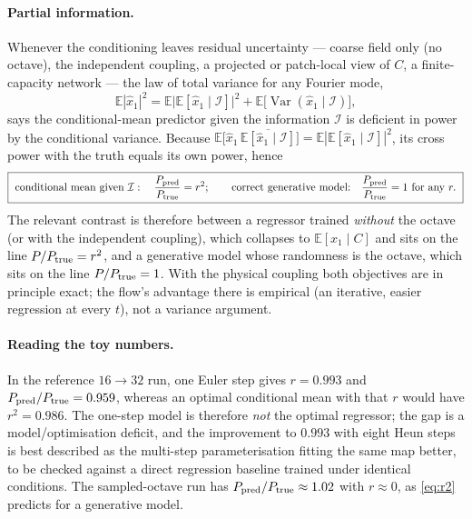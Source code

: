 \documentclass[11pt]{article}
\theoremstyle{definition}
\newcommand{\E}{\mathbb{E}}
\newcommand{\Var}{\operatorname{Var}}
\begin{document}
\paragraph{Partial information.} Whenever the conditioning leaves residual uncertainty --- coarse field only (no octave), the independent coupling, a projected or patch-local view of $C$, a finite-capacity network --- the law of total variance for any Fourier mode,
\begin{equation}
\E|\hat x_1|^2=\E\big|\E[\hat x_1\mid\mathcal I]\big|^2+\E\big[\Var(\hat x_1\mid\mathcal I)\big],
\end{equation}
says the conditional-mean predictor given the information $\mathcal I$ is deficient in power by the conditional variance. Because $\E\big[\hat x_1\,\overline{\E[\hat x_1\mid\mathcal I]}\big]=\E|\E[\hat x_1\mid\mathcal I]|^2$, its cross power with the truth equals its own power, hence
\begin{equation}
\boxed{\ \text{conditional mean given }\mathcal I:\quad \frac{P_{\rm pred}}{P_{\rm true}}=r^2 ;\qquad \text{correct generative model:}\quad \frac{P_{\rm pred}}{P_{\rm true}}=1\ \text{for any } r .\ }
\label{eq:r2}
\end{equation}
The relevant contrast is therefore between a regressor trained \emph{without} the octave (or with the independent coupling), which collapses to $\E[x_1\mid C]$ and sits on the line $P/P_{\rm true}=r^2$, and a generative model whose randomness is the octave, which sits on the line $P/P_{\rm true}=1$. With the physical coupling both objectives are in principle exact; the flow's advantage there is empirical (an iterative, easier regression at every $t$), not a variance argument.

\paragraph{Reading the toy numbers.} In the reference $16\to32$ run, one Euler step gives $r=0.993$ and $P_{\rm pred}/P_{\rm true}=0.959$, whereas an optimal conditional mean with that $r$ would have $r^2=0.986$. The one-step model is therefore \emph{not} the optimal regressor; the gap is a model/optimisation deficit, and the improvement to $0.993$ with eight Heun steps is best described as the multi-step parameterisation fitting the same map better, to be checked against a direct regression baseline trained under identical conditions. The sampled-octave run has $P_{\rm pred}/P_{\rm true}\approx1.02$ with $r\approx0$, as \eqref{eq:r2} predicts for a generative model.
\end{document}
